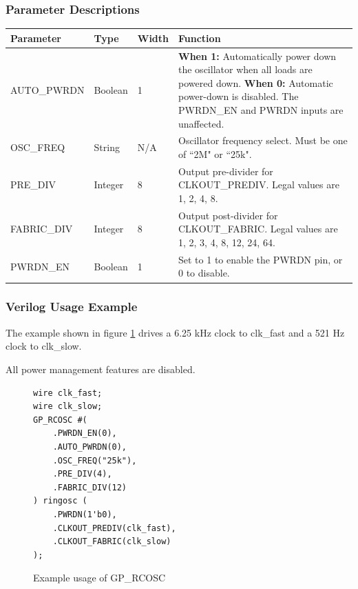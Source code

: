 \documentclass{article}
\begin{document}
\subsubsection{Parameter Descriptions}

\begin{tabularx}{5in}{|l|l|l|X|}
\hline
{\bfseries Parameter} & {\bfseries Type} & {\bfseries Width} & {\bfseries Function} \\
\hline
AUTO\_PWRDN & Boolean & 1 & 
	{\bfseries When 1: } \newline Automatically power down the oscillator when all loads are powered down. \newline
	{\bfseries When 0: } \newline Automatic power-down is disabled. The PWRDN\_EN and PWRDN inputs are unaffected.\\
\hline
OSC\_FREQ & String & N/A & Oscillator frequency select. Must be one of ``2M" or ``25k". \\
\hline
PRE\_DIV & Integer & 8 &
	Output pre-divider for CLKOUT\_PREDIV. Legal values are 1, 2, 4, 8. \\
\hline
FABRIC\_DIV & Integer & 8 &
	Output post-divider for CLKOUT\_FABRIC. Legal values are 1, 2, 3, 4, 8, 12, 24, 64. \\
\hline
PWRDN\_EN & Boolean & 1 & Set to 1 to enable the PWRDN pin, or 0 to disable. \\
\hline
\end{tabularx}

\pagebreak
\subsubsection{Verilog Usage Example}

The example shown in figure \ref{gp-rcosc-example} drives a 6.25 kHz clock to clk\_fast and a 521 Hz clock to
clk\_slow.

All power management features are disabled.

\begin{figure}[h]
\begin{lstlisting}
wire clk_fast;
wire clk_slow;
GP_RCOSC #(
	.PWRDN_EN(0),
	.AUTO_PWRDN(0),
	.OSC_FREQ("25k"),
	.PRE_DIV(4),
	.FABRIC_DIV(12)
) ringosc (
	.PWRDN(1'b0),
	.CLKOUT_PREDIV(clk_fast),
	.CLKOUT_FABRIC(clk_slow)
);
\end{lstlisting}
\caption{Example usage of GP\_RCOSC}
\label{gp-rcosc-example}
\end{figure}

\end{document}
